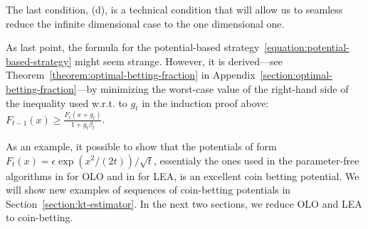 The last condition, (d), is a technical condition that will allow us to seamless reduce the infinite dimensional case to the one dimensional one.

As last point, the formula for the potential-based
strategy~\eqref{equation:potential-based-strategy} might seem strange. However,
it is derived---see Theorem~\ref{theorem:optimal-betting-fraction} in
Appendix~\ref{section:optimal-betting-fraction}---by minimizing the worst-case value of the right-hand side of the
inequality used w.r.t. to $g_t$ in the induction proof above: $F_{t-1}(x) \ge \tfrac{F_{t}(x + g_t)}{1+g_t\beta_t}$.

As an example, it possible to show that the potentials of form $F_t(x)=\epsilon \exp
\left(x^2/(2t)\right)/\sqrt{t}$, essentialy the ones used in the parameter-free algorithms in \cite{McMahan-Orabona-2014, Orabona-2014} for \ac{OLO} and in \cite{Chaudhuri-Freund-Hsu-2009, Luo-Schapire-2014,
Luo-Schapire-2015} for \ac{LEA}, is an excellent coin betting potential.
We will show new examples of sequences of coin-betting potentials in
Section~\ref{section:kt-estimator}.
In the next two sections, we reduce \ac{OLO} and \ac{LEA} to coin-betting.
